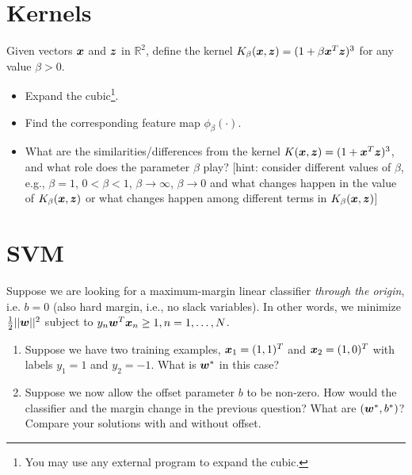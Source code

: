 \documentclass[11pt]{article}
\begin{document}
\ifnotsolution{\newpage}





\section{Kernels }
 Given vectors $\boldsymbol{x}$ and $\boldsymbol{z}$ in $\mathbb{R}^2$, define the kernel $K_\beta(\boldsymbol{x}, \boldsymbol{z}) = (1 + \beta \boldsymbol{x}^T \boldsymbol{z})^3$ for any value $\beta > 0$. 
 \begin{itemize}
    \item {} Expand the cubic\footnote{You may use any external program to expand the cubic.}. \\
    \solution{
}

    \item {}  Find the corresponding feature map $\phi_\beta(\cdot)$. \\
    \solution{
}

    \item {} What are the similarities/differences from the kernel $K(\boldsymbol{x}, \boldsymbol{z}) = (1 + \boldsymbol{x}^T \boldsymbol{z})^3$, and what role does the parameter $\beta$ play? [hint: consider different values of $\beta$, e.g., $\beta=1$, $0<\beta<1$, $\beta \rightarrow \infty$, $\beta \rightarrow 0$ and what changes happen in the value of $K_\beta(\boldsymbol{x}, \boldsymbol{z})$ or what changes happen among different terms in $K_\beta(\boldsymbol{x}, \boldsymbol{z})$] \\
    \solution{
}

 \end{itemize}
 


\section{SVM }

Suppose we are looking for a maximum-margin linear classifier \emph{through the origin}, i.e. $b=0$ (also hard margin, i.e., no slack variables). In other words, we minimize $\frac{1}{2}||\boldsymbol{w}||^2$ subject to $y_n \boldsymbol{w}^T \boldsymbol{x}_n \geq 1, n = 1, \ldots, N$.

\begin{enumerate}


\item {} Suppose we have two training examples, $\boldsymbol{x}_1 = (1,1)^T$ and $\boldsymbol{x}_2 = (1,0)^T$ with labels $y_1 = 1$ and $y_2 = -1$. What is $\boldsymbol{w}^\ast$ in this case?
\solution{
}


\item {} Suppose we now allow the offset parameter $b$ to be non-zero. How would the classifier and the margin change in the previous question? What are $(\boldsymbol{w}^\ast, b^\ast)$? Compare your solutions with and without offset.
\solution{
}

\end{enumerate}
\end{document}
